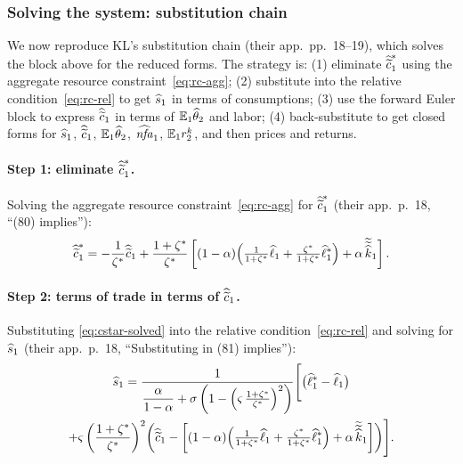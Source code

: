 \subsubsection{Solving the system: substitution chain}
\label{sec:engine-solve}

We now reproduce KL's substitution chain (their app.~pp.~18--19), which solves
the block above for the reduced forms. The strategy is: (1) eliminate
$\widehat{\widetilde{c}}^{*}_1$ using the aggregate resource constraint~\eqref{eq:rc-agg};
(2) substitute into the relative condition~\eqref{eq:rc-rel} to get $\widehat{s}_1$
in terms of consumptions; (3) use the forward Euler block to express $\widehat{\widetilde{c}}_1$
in terms of $\mathbb{E}_1\widehat{\theta}_2$ and labor; (4) back-substitute to get closed
forms for $\widehat{s}_1$, $\widehat{\widetilde{c}}_1$, $\mathbb{E}_1\widehat{\theta}_2$, $\widehat{\mathit{nfa}}_1$,
$\mathbb{E}_1r^{k}_2$, and then prices and returns.

\paragraph{Step 1: eliminate $\widehat{\widetilde{c}}^{*}_1$.} Solving the aggregate resource
constraint~\eqref{eq:rc-agg} for $\widehat{\widetilde{c}}^{*}_1$ (their app.~p.~18, ``(80)
implies''):
\begin{equation}
\widehat{\widetilde{c}}^{*}_1 = -\frac{1}{\zeta^{*}}\widehat{\widetilde{c}}_1
+\frac{1+\zeta^{*}}{\zeta^{*}}\left[(1-\alpha)\Bigl(\tfrac{1}{1+\zeta^{*}}\widehat{\ell}_1+\tfrac{\zeta^{*}}{1+\zeta^{*}}\widehat{\ell}^{*}_1\Bigr)+\alpha\,\widetilde{\widetilde{\widehat{k}}}_1\right]. \label{eq:cstar-solved}
\end{equation}

\paragraph{Step 2: terms of trade in terms of $\widehat{\widetilde{c}}_1$.} Substituting
\eqref{eq:cstar-solved} into the relative condition~\eqref{eq:rc-rel} and solving
for $\widehat{s}_1$ (their app.~p.~18, ``Substituting in (81) implies''):
\begin{multline}
\widehat{s}_1 = \frac{1}{\dfrac{\alpha}{1-\alpha}+\sigma\left(1-\left(\varsigma\,\frac{1+\zeta^{*}}{\zeta^{*}}\right)^2\right)}
\Biggl[\bigl(\widehat{\ell}^{*}_1-\widehat{\ell}_1\bigr)\\
+\varsigma\left(\frac{1+\zeta^{*}}{\zeta^{*}}\right)^2\!\left(\widehat{\widetilde{c}}_1
-\left[(1-\alpha)\Bigl(\tfrac{1}{1+\zeta^{*}}\widehat{\ell}_1+\tfrac{\zeta^{*}}{1+\zeta^{*}}\widehat{\ell}^{*}_1\Bigr)+\alpha\,\widetilde{\widetilde{\widehat{k}}}_1\right]\right)\Biggr]. \label{eq:s1-intermediate}
\end{multline}

